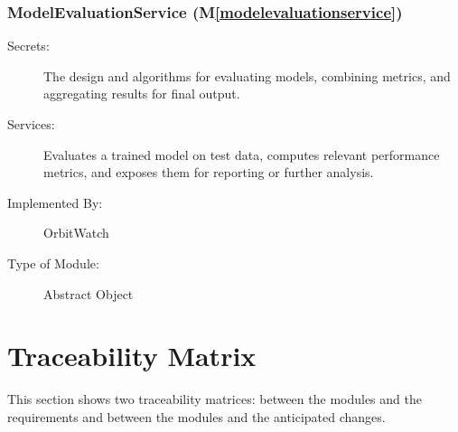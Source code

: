 \documentclass[12pt, titlepage]{article}
\newcommand{\mref}[1]{M\ref{#1}}
\begin{document}
\subsubsection{ModelEvaluationService (\mref{modelevaluationservice})}
\begin{description}
  \item[Secrets:] 
    The design and algorithms for evaluating models, combining metrics, and 
    aggregating results for final output.
  \item[Services:] 
    Evaluates a trained model on test data, computes relevant performance metrics,
    and exposes them for reporting or further analysis.
  \item[Implemented By:] 
    OrbitWatch
  \item[Type of Module:] 
    Abstract Object

\end{description}


\section{Traceability Matrix} \label{SecTM}

This section shows two traceability matrices: between the modules and the
requirements and between the modules and the anticipated changes.
\end{document}
